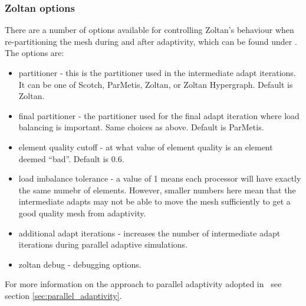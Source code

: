 \subsubsection{Zoltan options}
\label{sec:configuring_fluidity_zoltan_options}

There are a number of options available for controlling Zoltan's behaviour when re-partitioning the mesh during
and after adaptivity, which can be found under . The options are:
\begin{itemize}
\item partitioner - this is the partitioner used in the intermediate adapt iterations. It can be one of Scotch, ParMetis, Zoltan, or Zoltan Hypergraph. Default is Zoltan.
\item final partitioner - the partitioner used for the final adapt iteration where load balancing is important. Same choices as above. Default is ParMetis. 
\item element quality cutoff - at what value of element quality is an element deemed ``bad''. Default is 0.6.
\item load imbalance tolerance - a value of 1 means each processor will have exactly the same numebr of elements. However, smaller numbers here mean that the intermediate adapts may
not be able to move the mesh sufficiently to get a good quality mesh from adaptivity.
\item additional adapt iterations - increases the number of intermediate adapt iterations during parallel adaptive simulations.
\item zoltan debug - debugging options.
\end{itemize}

For more information on the approach to parallel adaptivity adopted in \fluidity\ see section \ref{sec:parallel_adaptivity}.
